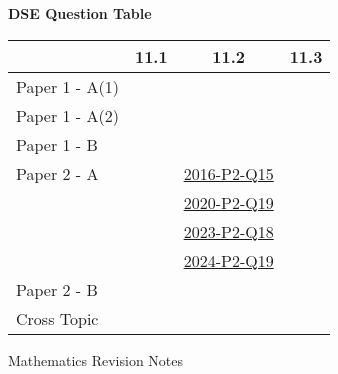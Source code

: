 \documentclass[12pt, a4paper]{article}
\begin{document}
\begin{absolutelynopagebreak}
\begin{center}
\textbf{DSE Question Table}
\end{center}
\begin{center}
\begin{tabular}{|l|c|c|c|}
\hline
        & 11.1 & 11.2 & 11.3 \\\hline
\hline
Paper 1 - A(1)&  &  &  \\
\hline
Paper 1 - A(2)&  &  &  \\
\hline
Paper 1 - B&  &  &  \\
\hline
\hline
Paper 2 - A&  & \hyperref[DSE2016-CoreP2-Q15]{2016-P2-Q15} &  \\
&  & \hyperref[DSE2020-CoreP2-Q19]{2020-P2-Q19} &  \\
&  & \hyperref[DSE2023-CoreP2-Q18]{2023-P2-Q18} &  \\
&  & \hyperref[DSE2024-CoreP2-Q19]{2024-P2-Q19} &  \\
\hline
Paper 2 - B&  &  &  \\
\hline
\hline
Cross Topic&  &  &  \\
\hline
\end{tabular}
\end{center}
\end{absolutelynopagebreak}
\newpage
\newpage
\thispagestyle{empty}
\begin{center}
Mathematics Revision Notes\\\vspace{1cm}
\\\vspace{1cm}
{\fontsize{24pt}{24pt}\selectfont {Manipulation of Simple Polynomials}} \\\vspace{1cm}
\label{chapter:S1-12}

\end{center}
\vspace{0.5cm}
\hline
\end{document}
